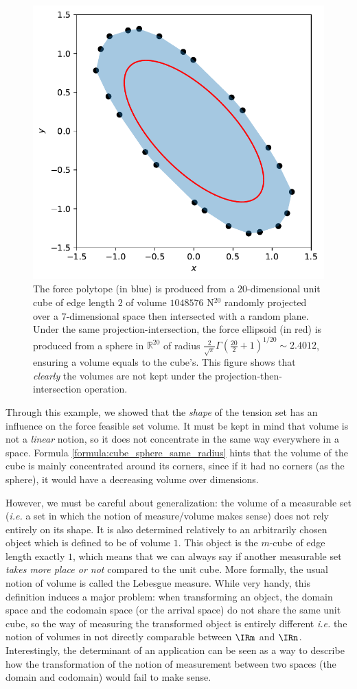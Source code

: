 \begin{figure}[!htb]
    \captionsetup{justification=centering}
        \centering
        \includegraphics[trim={0 0 0 0},clip, width=0.5\linewidth]{img/chapter_3/myIma4_projection_cube_sphere_same_volume.pdf}    
    \caption{The force polytope (in blue) is produced from a $20$-dimensional unit cube of edge length $2$ of volume $1048576$ N$^{20}$ randomly projected over a $7$-dimensional space then intersected with a random plane. Under the same projection-intersection, the force ellipsoid (in red) is produced from a sphere in $\mathbb{R}^{20}$ of radius $\frac{2}{\sqrt{\pi}}\Gamma\left(\frac{20}{2}+1\right)^{1/20}\sim 2.4012$, ensuring a volume equals to the cube's. This figure shows that \emph{clearly} the volumes are not kept under the projection-then-intersection operation.}
    \label{fig:ellipsoid_scale_same_volume}
\end{figure}

Through this example, we showed that the \emph{shape} of the tension set has an influence on the force feasible set volume. It must be kept in mind that volume is not a \emph{linear} notion, so it does not concentrate in the same way everywhere in a space. Formula \ref{formula:cube_sphere_same_radius} hints that the volume of the cube is mainly concentrated around its corners, since if it had no corners (as the sphere), it would have a decreasing volume over dimensions.

However, we must be careful about generalization: the volume of a measurable set (\emph{i.e.} a set in which the notion of measure/volume makes sense) does not rely entirely on its shape. It is also determined relatively to an arbitrarily chosen object which is defined to be of volume $1$. This object is the $m$-cube of edge length exactly $1$, which means that we can always say if another measurable set \emph{takes more place or not} compared to the unit cube. More formally, the usual notion of volume is called the Lebesgue measure. While very handy, this definition induces a major problem: when transforming an object, the domain space and the codomain space (or the arrival space) do not share the same unit cube, so the way of measuring the transformed object is entirely different \emph{i.e.} the notion of volumes in not directly comparable between $\IRm$ and $\IRn$. Interestingly, the determinant of an application can be seen as a way to describe how the transformation of the notion of measurement between two spaces (the domain and codomain) would fail to make sense.

